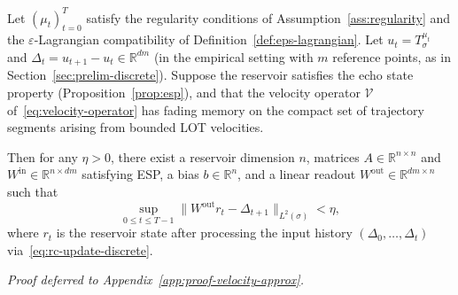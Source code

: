 \documentclass[11pt]{article}
\newcommand{\R}{\mathbb{R}}
\newcommand{\1}{\mathbf{1}}
\begin{document}
\begin{theorem}\label{thm:velocity-approx}
Let $(\mu_t)_{t=0}^T$ satisfy the regularity conditions of
Assumption~\ref{ass:regularity} and the $\varepsilon$-Lagrangian
compatibility of Definition~\ref{def:eps-lagrangian}. Let $u_t =
T_\sigma^{\mu_t}$ and $\Delta_t = u_{t+1} - u_t \in \R^{dm}$ (in the
empirical setting with $m$ reference points, as in
Section~\ref{sec:prelim-discrete}). Suppose the reservoir
satisfies the echo state property
(Proposition~\ref{prop:esp}), and that the velocity operator $\mathcal{V}$
of~\eqref{eq:velocity-operator} has fading memory on the compact set of trajectory segments arising from bounded LOT velocities.

Then for any $\eta > 0$, there exist a reservoir dimension $n$, matrices
$A \in \R^{n \times n}$ and $W^{\mathrm{in}} \in \R^{n \times dm}$
satisfying ESP, a bias $b \in \R^n$, and a linear readout
$W^{\mathrm{out}} \in \R^{dm \times n}$ such that
\begin{equation}\label{eq:velocity-approx-bound}
  \sup_{0 \leq t \leq T-1}
  \|W^{\mathrm{out}} r_t - \Delta_{t+1}\|_{L^2(\sigma)} < \eta,
\end{equation}
where $r_t$ is the reservoir state after processing the input history
$(\Delta_0, \ldots, \Delta_t)$
via~\eqref{eq:rc-update-discrete}.
\end{theorem}
\noindent\emph{Proof deferred to Appendix~\ref{app:proof-velocity-approx}.}
\end{document}
